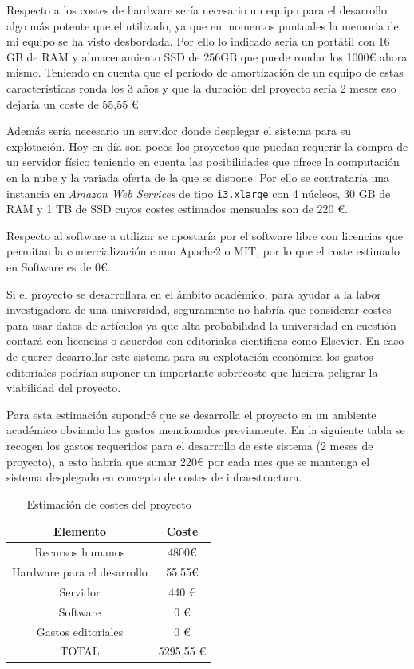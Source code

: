 Respecto a los costes de hardware sería necesario un equipo para el desarrollo algo más potente que el utilizado, ya que en momentos puntuales la memoria de mi equipo se ha visto desbordada.
Por ello lo indicado sería un portátil con 16 GB de RAM y almacenamiento SSD de 256GB que puede rondar los 1000€ ahora mismo. Teniendo en cuenta que el periodo de amortización de un equipo de estas características ronda los 3 años y que la duración del proyecto sería 2 meses eso dejaría un coste de 55,55 €

Además sería necesario un servidor donde desplegar el sistema para su explotación. Hoy en día son pocos los proyectos que puedan requerir la compra de un servidor físico teniendo en cuenta las posibilidades que ofrece la computación en la nube y la variada oferta de la que se dispone. Por ello se contrataría una instancia en \textit{Amazon Web Services} de tipo \texttt{i3.xlarge} con 4 núcleos, 30 GB de RAM y 1 TB de SSD cuyos costes estimados mensuales son de 220 €.

Respecto al software a utilizar se apostaría por el software libre con licencias que permitan la comercialización como Apache2 o MIT, por lo que el coste estimado en Software es de 0€.

Si el proyecto se desarrollara en el ámbito académico, para ayudar a la labor investigadora de una universidad, seguramente no habría que considerar costes para usar datos de artículos ya que alta probabilidad la universidad en cuestión contará con licencias o acuerdos con editoriales científicas como Elsevier. En caso de querer desarrollar este sistema para su explotación económica los gastos editoriales podrían suponer un importante sobrecoste que hiciera peligrar la viabilidad del proyecto.

Para esta estimación supondré que se desarrolla el proyecto en un ambiente académico obviando los gastos mencionados previamente. En la siguiente tabla se recogen los gastos requeridos para el desarrollo de este sistema (2 meses de proyecto), a esto habría que sumar 220€ por cada mes que se mantenga el sistema desplegado en concepto de costes de infraestructura.

\begin{table} [h!]
	\centering
	\begin{tabular}{| c | c |}
		\hline
		     \textbf{Elemento}      & \textbf{Coste} \\ \hline
		     Recursos humanos       & 4800€          \\
		Hardware para el desarrollo & 55,55€         \\
		         Servidor           & 440 €          \\
		         Software           & 0 €            \\
		    Gastos editoriales      & 0 €            \\ \hline
		    TOTAL & 5295,55 € \\ \hline
	\end{tabular}
	\caption{Estimación de costes del proyecto}
\end{table}




